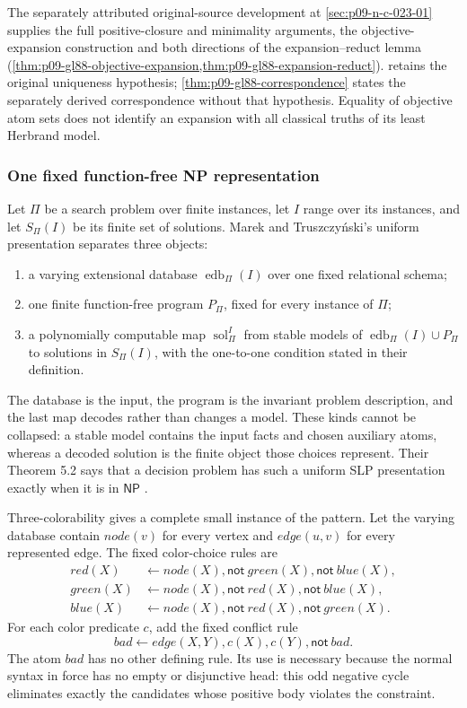 The separately attributed original-source development at
\cref{sec:p09-n-c-023-01} supplies the full positive-closure and
minimality arguments, the objective-expansion construction and both
directions of the expansion--reduct lemma
(\cref{thm:p09-gl88-objective-expansion,thm:p09-gl88-expansion-reduct}).
 retains the original uniqueness hypothesis;
\cref{thm:p09-gl88-correspondence} states the separately derived
correspondence without that hypothesis. Equality of objective atom sets
does not identify an expansion with all classical truths of its least
Herbrand model.

\subsubsection{One fixed function-free NP representation}

Let \(\Pi\) be a search problem over finite instances, let \(I\) range over its
instances, and let \(S_\Pi(I)\) be its finite set of solutions.  Marek and Truszczyński's
uniform presentation separates three objects:
\begin{enumerate}
\item a varying extensional database \(\operatorname{edb}_{\Pi}(I)\) over one
  fixed relational schema;
\item one finite function-free program \(P_\Pi\), fixed for every instance of
  \(\Pi\);
\item a polynomially computable map \(\operatorname{sol}^{I}_{\Pi}\) from
  stable models of \(\operatorname{edb}_{\Pi}(I)\cup P_\Pi\) to solutions in
  \(S_\Pi(I)\), with the one-to-one condition stated in their definition.
\end{enumerate}
The database is the input, the program is the invariant problem description,
and the last map decodes rather than changes a model.  These kinds cannot be
collapsed: a stable model contains the input facts and chosen auxiliary atoms,
whereas a decoded solution is the finite object those choices represent.
Their Theorem 5.2 says that a decision problem has such a uniform SLP
presentation exactly when it is in \(\mathsf{NP}\)
\cite[\S5, thm.~5.2]{MarekTruszczynski1999}.

Three-colorability gives a complete small instance of the pattern.  Let the
varying database contain \(node(v)\) for every vertex and \(edge(u,v)\) for
every represented edge.  The fixed color-choice rules are
\[
\begin{aligned}
 red(X)&\leftarrow node(X),\mathsf{not}\ green(X),
                         \mathsf{not}\ blue(X),\\
 green(X)&\leftarrow node(X),\mathsf{not}\ red(X),
                           \mathsf{not}\ blue(X),\\
 blue(X)&\leftarrow node(X),\mathsf{not}\ red(X),
                          \mathsf{not}\ green(X).
\end{aligned}
\]
For each color predicate \(c\), add the fixed conflict rule
\[
 bad\leftarrow edge(X,Y),c(X),c(Y),\mathsf{not}\ bad.
\]
The atom \(bad\) has no other defining rule.  Its use is necessary because the
normal syntax in force has no empty or disjunctive head: this odd negative cycle
eliminates exactly the candidates whose positive body violates the constraint.

